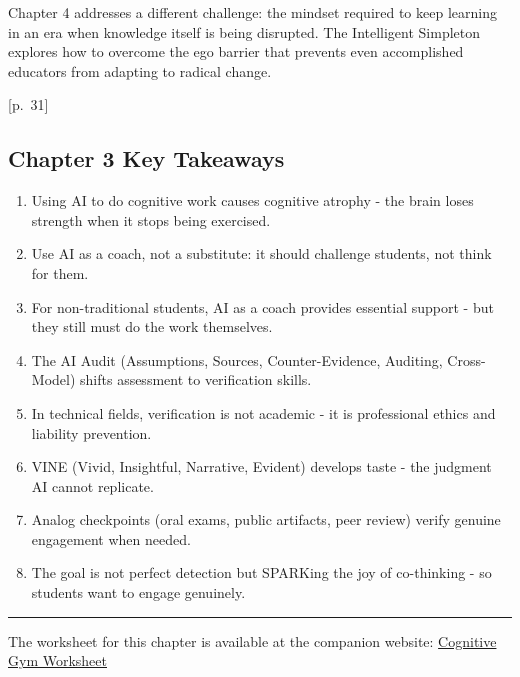 \documentclass[
  letterpaper,
  DIV=11,
  numbers=noendperiod]{scrreprt}
\providecommand{\tightlist}{%
  \setlength{\itemsep}{0pt}\setlength{\parskip}{0pt}}
\begin{document}
Chapter 4 addresses a different challenge: the mindset required to keep
learning in an era when knowledge itself is being disrupted. The
Intelligent Simpleton explores how to overcome the ego barrier that
prevents even accomplished educators from adapting to radical change.

{[}p.~31{]}

\subsection{Chapter 3 Key Takeaways}\label{chapter-3-key-takeaways}

\begin{enumerate}
\def\labelenumi{\arabic{enumi}.}
\tightlist
\item
  Using AI to do cognitive work causes cognitive atrophy - the brain
  loses strength when it stops being exercised.
\item
  Use AI as a coach, not a substitute: it should challenge students, not
  think for them.
\item
  For non-traditional students, AI as a coach provides essential support
  - but they still must do the work themselves.
\item
  The AI Audit (Assumptions, Sources, Counter-Evidence, Auditing,
  Cross-Model) shifts assessment to verification skills.
\item
  In technical fields, verification is not academic - it is professional
  ethics and liability prevention.
\item
  VINE (Vivid, Insightful, Narrative, Evident) develops taste - the
  judgment AI cannot replicate.
\item
  Analog checkpoints (oral exams, public artifacts, peer review) verify
  genuine engagement when needed.
\item
  The goal is not perfect detection but SPARKing the joy of co-thinking
  - so students want to engage genuinely.
\end{enumerate}

\begin{center}\rule{0.5\linewidth}{0.5pt}\end{center}

\begin{tcolorbox}[enhanced jigsaw, arc=.35mm, bottomrule=.15mm, bottomtitle=1mm, breakable, colback=white, colbacktitle=quarto-callout-note-color!10!white, colframe=quarto-callout-note-color-frame, coltitle=black, left=2mm, leftrule=.75mm, opacityback=0, opacitybacktitle=0.6, rightrule=.15mm, title=\textcolor{quarto-callout-note-color}{\faInfo}\hspace{0.5em}{Companion Worksheet}, titlerule=0mm, toprule=.15mm, toptitle=1mm]

The worksheet for this chapter is available at the companion website:
\href{https://dataii.com/ai/guidebook/\#:~:text=Cognitive\%20Gym\%20Worksheet}{Cognitive
Gym Worksheet}

\end{tcolorbox}
\end{document}
